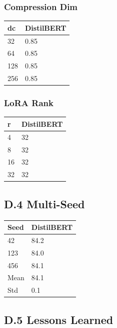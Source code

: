 \subsubsection{Compression Dim}

\begin{table}[H]
\centering
\small
\begin{tabular}{ll}
\toprule
\textbf{dc} & \textbf{DistilBERT} \\
\midrule
32 & 0.85 \\
64 & 0.85 \\
128 & 0.85 \\
256 & 0.85 \\
\bottomrule
\end{tabular}
\end{table}

\subsubsection{LoRA Rank}

\begin{table}[H]
\centering
\small
\begin{tabular}{ll}
\toprule
\textbf{r} & \textbf{DistilBERT} \\
\midrule
4 & 32 \\
8 & 32 \\
16 & 32 \\
32 & 32 \\
\bottomrule
\end{tabular}
\end{table}

\subsection{D.4 Multi-Seed}

\begin{table}[H]
\centering
\small
\begin{tabular}{ll}
\toprule
\textbf{Seed} & \textbf{DistilBERT} \\
\midrule
42 & 84.2 \\
123 & 84.0 \\
456 & 84.1 \\
Mean & 84.1 \\
Std & 0.1 \\
\bottomrule
\end{tabular}
\end{table}

\subsection{D.5 Lessons Learned}

